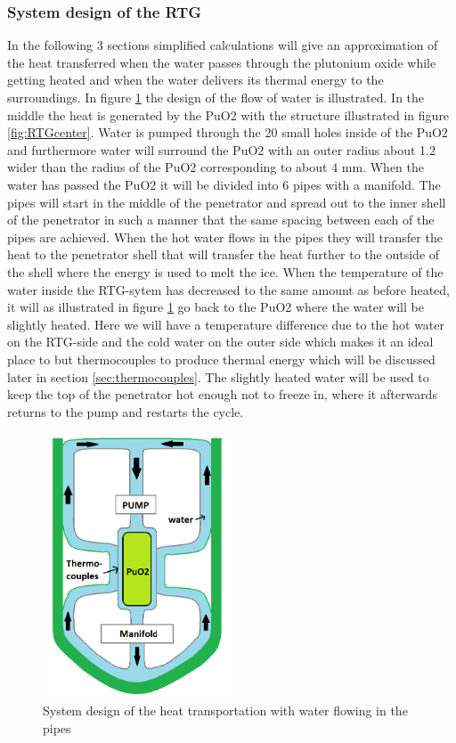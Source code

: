 \subsubsection{System design of the RTG} 
In the following 3 sections simplified calculations will give an approximation of the heat transferred when the water passes through the plutonium oxide while getting heated and when the water delivers its thermal energy to the surroundings. In figure \ref{fig:RTGsystem} the design of the flow of water is illustrated. In the middle the heat is generated by the PuO2 with the structure illustrated in figure \ref{fig:RTGcenter}. Water is pumped through the 20 small holes inside of the PuO2 and furthermore water will surround the PuO2 with an outer radius about 1.2 wider than the radius of the PuO2 corresponding to about 4 mm. When the water has passed the PuO2 it will be divided into 6 pipes with a manifold. The pipes will start in the middle of the penetrator and spread out to the inner shell of the penetrator in such a manner that the same spacing between each of the pipes are achieved. When the hot water flows in the pipes they will transfer the heat to the penetrator shell that will transfer the heat further to the outside of the shell where the energy is used to melt the ice. When the temperature of the water inside the RTG-sytem has decreased to the same amount as before heated, it will as illustrated in figure \ref{fig:RTGsystem} go back to the PuO2 where the water will be slightly heated. Here we will have a temperature difference due to the hot water on the RTG-side and the cold water on the outer side which makes it an ideal place to but thermocouples to produce thermal energy which will be discussed later in section \ref{sec:thermocouples}. The slightly heated water will be used to keep the top of the penetrator hot enough not to freeze in, where it afterwards returns to the pump and restarts the cycle. 
\begin{figure}[htb]
  \centering
  \includegraphics[width=0.5\textwidth]{figures/Ricardo/RTG-system.png}
  \caption{System design of the heat transportation with water flowing in the pipes}
  \label{fig:RTGsystem}
\end{figure}


